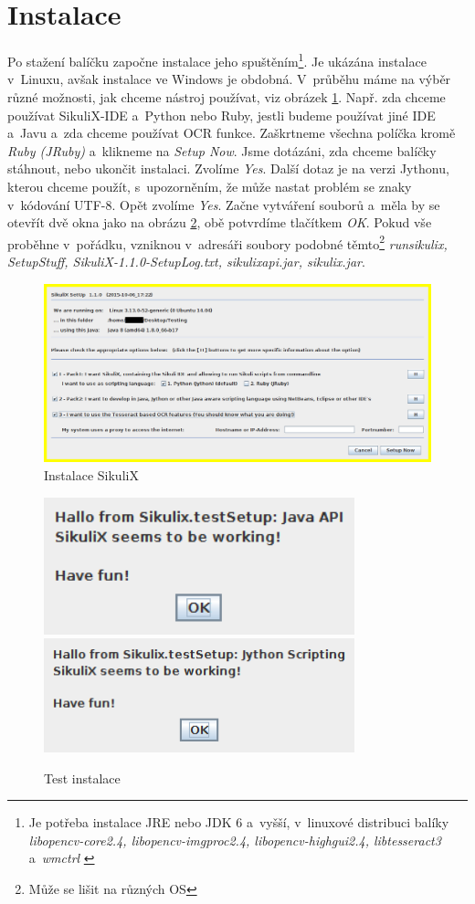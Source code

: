 \documentclass{bakalarka}
\begin{document}
	\section{Instalace}
	Po stažení balíčku započne instalace jeho spuštěním\footnote{Je potřeba instalace JRE nebo JDK 6 a~vyšší, v~linuxové distribuci balíky \emph{libopencv-core2.4, libopencv-imgproc2.4, libopencv-highgui2.4, libtesseract3} a~\emph{wmctrl} \cite{SikuliX}}. Je ukázána instalace v~Linuxu, avšak instalace ve Windows je obdobná. V~průběhu máme na výběr různé možnosti, jak chceme nástroj používat, viz obrázek \ref{Instal}. Např. zda chceme používat SikuliX-IDE a~Python nebo Ruby, jestli budeme používat jiné IDE a~Javu a~zda chceme používat OCR funkce. Zaškrtneme všechna políčka kromě \emph{Ruby (JRuby)} a~klikneme na \emph{Setup Now}. Jsme dotázáni, zda chceme balíčky stáhnout, nebo ukončit instalaci. Zvolíme \emph{Yes}. Další dotaz je na verzi Jythonu, kterou chceme použít, s~upozorněním, že může nastat problém se znaky v~kódování UTF-8. Opět zvolíme \emph{Yes}. Začne vytváření souborů a~měla by se otevřít dvě okna jako na obrázu \ref{InstalOK}, obě potvrdíme tlačítkem \emph{OK}. Pokud vše proběhne v~pořádku, vzniknou v~adresáři soubory podobné těmto\footnote{Může se lišit na různých OS} \emph{runsikulix, SetupStuff, SikuliX-1.1.0-SetupLog.txt, sikulixapi.jar, sikulix.jar}.
	\begin{figure}[ht!]
		\centering
		\caption{Instalace SikuliX}
		\label{Instal}
		\includegraphics[width=14cm]{img/Instalace/Instalace.png}
	\end{figure}
	\begin{figure}[ht!]
		\centering
		\caption{Test instalace}
		\label{InstalOK}
		\includegraphics[width=9cm]{img/Instalace/InstalaceOK.png}\\[0.3cm]
		\includegraphics[width=9cm]{img/Instalace/InstalaceOK1.png}
	\end{figure}
	
\end{document}
